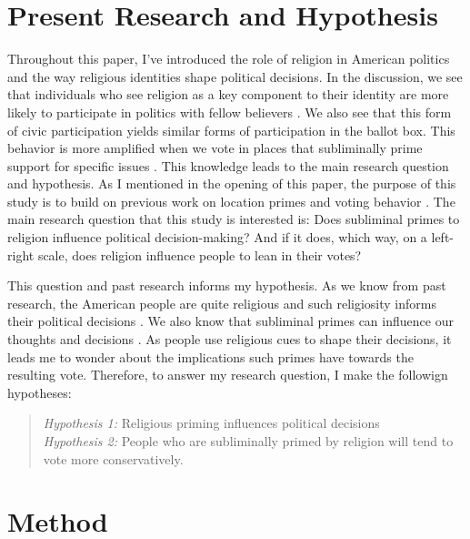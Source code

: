 \documentclass[letterpaper,man,natbib,noextraspace,12pt]{apa6}  %
\newcommand\e{\emph}
\begin{document}
\section{Present Research and Hypothesis}

Throughout this paper, I’ve introduced the role of religion in American politics and the way religious identities shape political decisions. In the discussion, we see that individuals who see religion as a key component to their identity are more likely to participate in politics with fellow believers \citep{putnam_american_2010}. We also see that this form of civic participation yields similar forms of participation in the ballot box. This behavior is more amplified when we vote in places that subliminally prime support for specific issues \citep{berger_contextual_2008, rutchick_deus_2010}. This knowledge leads to the main research question and hypothesis. As I mentioned in the opening of this paper, the purpose of this study is to build on previous work on location primes and voting behavior \citep{berger_contextual_2008}. The main research question that this study is interested is: Does subliminal primes to religion influence political decision-making? And if it does, which way, on a left-right scale, does religion influence people to lean in their votes?

This question and past research informs my hypothesis. As we know from past research, the American people are quite religious \citep{putnam_american_2010} and such religiosity informs their political decisions \citep{rutchick_deus_2010}. We also know that subliminal primes can influence our thoughts \citep{kahneman_thinking_2012} and decisions \citep{albertson_religious_2011, kam_implicit_2007}. As people use religious cues to shape their decisions, it leads me to wonder about the implications such primes have towards the resulting vote. Therefore, to answer my research question, I make the followign hypotheses:

\begin{quote}
	\e{Hypothesis 1:} Religious priming influences political decisions \\
	\e{Hypothesis 2:} People who are subliminally primed by religion will tend to vote more conservatively. \\
\end{quote} 


\section{Method}
\end{document}
